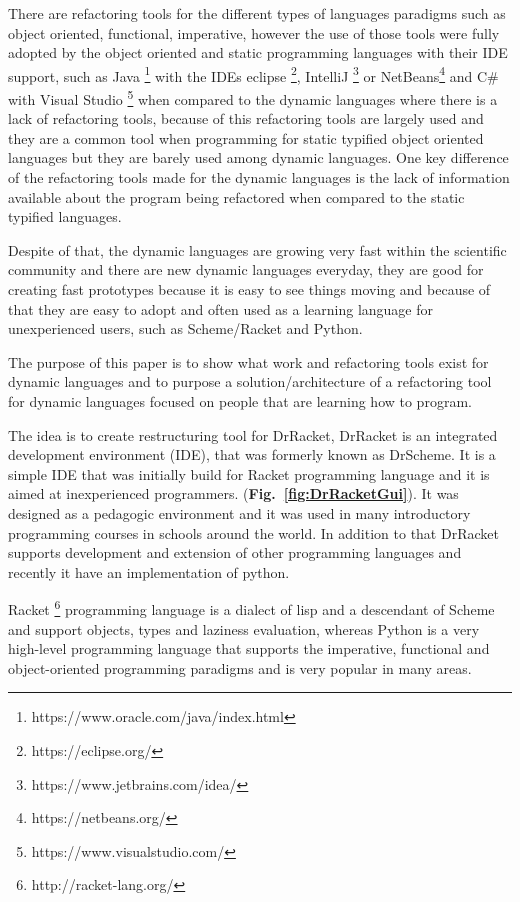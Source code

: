 There are refactoring tools for the different types of languages paradigms such as object oriented, functional, imperative, however the use of those tools were fully adopted by the object oriented and static programming languages with their IDE support, such as Java \footnote{https://www.oracle.com/java/index.html} with the IDEs eclipse \footnote{https://eclipse.org/}, IntelliJ \footnote{https://www.jetbrains.com/idea/} or NetBeans\footnote{https://netbeans.org/} and C\# with Visual Studio \footnote{https://www.visualstudio.com/} when %
compared to the dynamic languages where there is a lack of refactoring tools, because of this refactoring tools are largely used and they are a common tool when programming for static typified object oriented languages but they are barely used among dynamic languages. 
One key difference of the refactoring tools made for the dynamic languages is the lack of information available about the program being refactored when compared to the static typified languages.

Despite of that, the dynamic languages are growing very fast within the scientific community and there are new dynamic languages everyday, they are good for creating fast prototypes because it is easy to see things moving and because of that they are easy to adopt and often used as a learning language for unexperienced users, such as Scheme/Racket and Python. %


The purpose of this paper is to show what work and refactoring tools exist for dynamic languages and to purpose a solution/architecture of a refactoring tool for dynamic languages focused on people that are learning how to program. %


The idea is to create restructuring tool for DrRacket, DrRacket is an integrated development environment (IDE), that was formerly known as DrScheme. It is a simple IDE that was initially build for Racket programming language and it is aimed at inexperienced programmers. ({\bf Fig.~\ref{fig:DrRacketGui}}).
It was designed as a pedagogic environment \cite{drscheme_pegadogy} and it was used in many introductory programming courses in schools around the world. In addition to that DrRacket supports development and extension of other programming languages \cite{tobin2011languages} and recently it have an implementation of python. \cite{ramos2014implementation}


Racket \footnote{http://racket-lang.org/} programming language is a dialect of lisp and a descendant of Scheme and support objects, types and laziness evaluation,
whereas Python is a very high-level programming language that supports the imperative, functional and object-oriented programming paradigms and is very popular in many areas.




